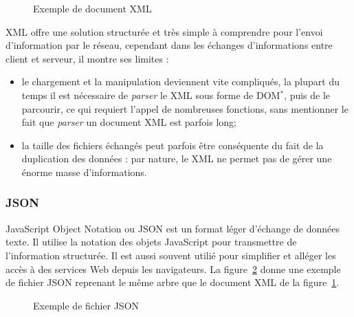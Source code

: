 \vspace{0.20cm}

\begin{figure}[!ht]
	
	\caption{Exemple de document XML}
	\label{code:exempleXML}

\end{figure}

XML offre une solution structur\'ee et tr\`es simple \`a comprendre pour l'envoi d'information par le r\'eseau, cependant dans les \'echanges d'informations entre client et serveur, il montre ses limites :

\begin{itemize}
	\item le chargement et la manipulation deviennent vite compliqu\'es, la plupart du temps il est n\'ecessaire de \textit{parser} le XML sous forme de DOM$^*$, puis de le parcourir, ce qui requiert l'appel de nombreuses fonctions, sans mentionner le fait que \textit{parser} un document XML est parfois long;
	\item la taille des fichiers \'echang\'es peut parfois \^etre cons\'equente du fait de la duplication des donn\'ees : par nature, le XML ne permet pas de g\'erer une \'enorme masse d'informations.

\end{itemize}

\subsubsection{JSON}

JavaScript Object Notation ou JSON est un format l\'eger d'\'echange de donn\'ees texte.
Il utilise la notation des objets JavaScript pour transmettre de l'information structur\'ee.
Il est aussi souvent utili\'e pour simplifier et all\'eger les acc\`es \`a des services Web depuis les navigateurs.
La figure~\ref{code:exempleJSON} donne une exemple de fichier JSON reprenant le m\^eme arbre que le document XML de la figure~\ref{code:exempleXML}.

\vspace{0.20cm}

\begin{figure}[!ht]
	
	\caption{Exemple de fichier JSON}
	\label{code:exempleJSON}

\end{figure}

